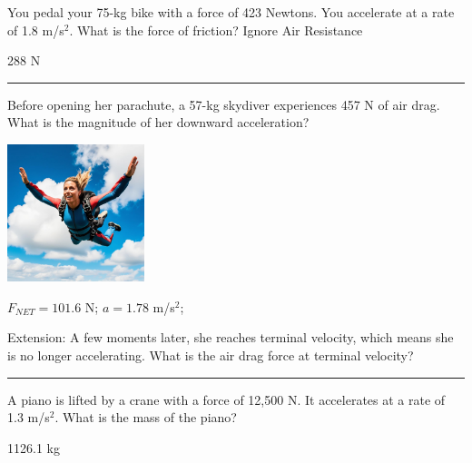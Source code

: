 \documentclass[12pt]{exam}
\begin{document}
\Large

\def\mystrut{\protect\rule[-2.2ex]{0ex}{2.2ex}} 
\qformat{ \textbf{Task \#\thequestion}
  \ifthenelse{\equal{\thequestion}{\thequestiontitle}}
    {}
    {: \emph{\thequestiontitle}}
  \mystrut  \hfill}


\begin{questions}


\question
  You pedal your 75-kg bike with a force of 423 Newtons.  You accelerate at a rate of 1.8 m/s$^2$.  What is the force of friction?  Ignore Air Resistance

  \begin{solution}
    288 N
  \end{solution}


\vs \hrule \vs

\question
  Before opening her parachute, a 57-kg skydiver experiences 457 N of air drag.  What is the magnitude of her downward acceleration?
  
  \includegraphics[height=4cm]{skydiver.jpg}
  \begin{solution}
      $F_{NET}=101.6$ N; $a=1.78$ m/s$^2$;

      Extension: A few moments later, she reaches terminal velocity, which means she is no longer accelerating.  What is the air drag force at terminal velocity?
  \end{solution}

\vs \hrule \vs



\question
  A piano is lifted by a crane with a force of 12,500 N.  It accelerates at a rate of 1.3 m/s$^2$.  What is the mass of the piano?

  \begin{solution}
    1126.1 kg
  \end{solution}

\vs 

\end{questions}
\end{document}
